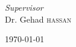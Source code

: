 \begin{titlepage}
	\begin{minipage}{\textwidth}
		\begin{center}
			\large
			\textit{Supervisor}\\
			Dr. Gehad \textsc{hassan}
		\end{center}
	\end{minipage}
	
	
	\vfill\vfill\vfill %
	
	{\large\today} %
	
	\vfill %
	
\end{titlepage}